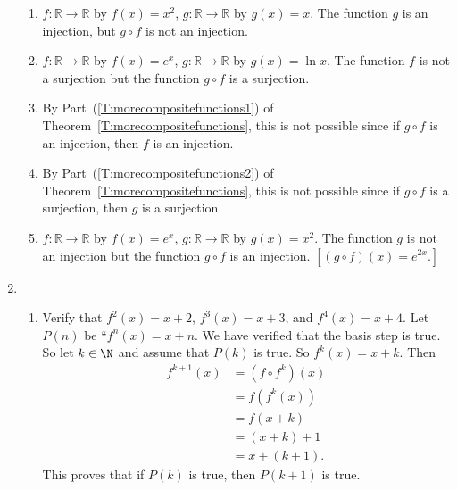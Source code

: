 \begin{enumerate}
\begin{enumerate}
\item $f: \mathbb{R} \to \mathbb{R}$ by $f \left( x \right) = x^2$, 
$g: \mathbb{R} \to \mathbb{R}$ by $g \left( x \right) = x$.  The function $g$ is an injection, but $g \circ f$ is not an injection.

\item $f:\mathbb{R} \to \mathbb{R}$ by $f \left( x \right) = e^x$, 
$g:\mathbb{R} \to \mathbb{R}$ by $g \left( x \right) = \ln x$.  The function $f$ is not a surjection but the function $g \circ f$ is a surjection.

\item By Part~(\ref{T:morecompositefunctions1}) of Theorem~\ref{T:morecompositefunctions}, this is not possible since if $g \circ f$ is an injection, then $f$ is an injection.

\item By Part~(\ref{T:morecompositefunctions2}) of Theorem~\ref{T:morecompositefunctions}, this is not possible since if $g \circ f$ is a surjection, then $g$ is a surjection.

\item $f:\mathbb{R} \to \mathbb{R}$ by $f \left( x \right) = e^x$, 
$g:\mathbb{R} \to \mathbb{R}$ by $g \left( x \right) = x^2$.  The function $g$ is not an injection but the function $g \circ f$ is an injection. 
$\left[ \left( g \circ f \right) \left( x \right) = e^{2x}.\right]$
\end{enumerate}



\item \begin{enumerate}
\item Verify that $f^2(x) = x + 2$, $f^3(x) = x + 3$, and $f^4(x) = x + 4$.  Let $P(n)$ be 
``$f^n(x) = x + n$.  We have verified that the basis step is true.  So let $k \in \N$ and assume that $P(k)$ is true.  So $f^k(x) = x + k$.  Then
\begin{align*}
f^{k+1}(x) &= \left( f \circ f^k \right)(x) \\
           &= f \left( f^k(x) \right) \\
           &= f(x + k) \\
           &= (x + k) + 1 \\
           &= x + (k + 1).
\end{align*}
This proves that if $P(k)$ is true, then $P(k + 1)$ is true.


\end{enumerate}
\end{enumerate}
